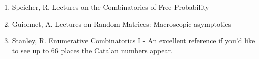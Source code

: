 \begin{enumerate}[(1)]
\item Speicher, R. Lectures on the Combinatorics of Free Probability
\item Guionnet, A. Lectures on Random Matrices: Macroscopic asymptotics
\item Stanley, R. Enumerative Combinatorics I - An excellent reference if you'd like to see up to 66 places the Catalan numbers appear.
\end{enumerate}
































